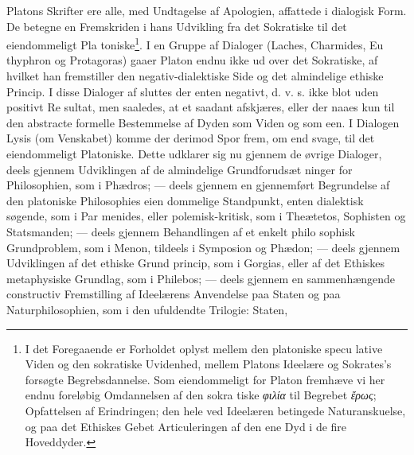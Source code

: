 \documentclass[12pt,a4paper]{book}
\newcommand{\gk}[1]{\textit{#1}}
\begin{document}
Platons Skrifter ere alle, med Undtagelse af Apologien,
affattede i dialogisk Form. De betegne en Fremskriden i
hans Udvikling fra det Sokratiske til det eiendommeligt Pla\-%
toniske\footnote{I det Foregaaende er Forholdet oplyst mellem den platoniske specu\-%
lative Viden og den sokratiske Uvidenhed, mellem Platons Ideelære
og Sokrates's forsøgte Begrebsdannelse. Som eiendommeligt for
Platon fremhæve vi her endnu foreløbig Omdannelsen af den sokra\-%
tiske \gk{φιλία} til Begrebet \gk{ἔρως}; Opfattelsen af Erindringen; den hele
ved Ideelæren betingede Naturanskuelse, og paa det Ethiskes Gebet
Articuleringen af den ene Dyd i de fire Hoveddyder.}. I en Gruppe af Dialoger (Laches, Charmides, Eu\-%
thyphron og Protagoras) gaaer Platon endnu ikke ud over det
Sokratiske, af hvilket han fremstiller den negativ-dialektiske
Side og det almindelige ethiske Princip. I disse Dialoger af\-%
sluttes der enten negativt, d. v. s. ikke blot uden positivt Re\-%
sultat, men saaledes, at et saadant afskjæres, eller der naaes
kun til den abstracte formelle Bestemmelse af Dyden som
Viden og som een. I Dialogen Lysis (om Venskabet) komme
der derimod Spor frem, om end svage, til det eiendommeligt
Platoniske. Dette udklarer sig nu gjennem de øvrige Dialoger,
deels gjennem Udviklingen af de almindelige Grundforudsæt\-%
ninger for Philosophien, som i Phædros; --- deels gjennem en
gjennemført Begrundelse af den platoniske Philosophies eien\-%
dommelige Standpunkt, enten dialektisk søgende, som i Par\-%
menides, eller polemisk-kritisk, som i Theætetos, Sophisten og
Statsmanden; --- deels gjennem Behandlingen af et enkelt philo\-%
sophisk Grundproblem, som i Menon, tildeels i Symposion og
Phædon; --- deels gjennem Udviklingen af det ethiske Grund\-%
princip, som i Gorgias, eller af det Ethiskes metaphysiske
Grundlag, som i Philebos; --- deels gjennem en sammenhængende
constructiv Fremstilling af Ideelærens Anvendelse paa Staten
og paa Naturphilosophien, som i den ufuldendte Trilogie: Staten,
\end{document}
